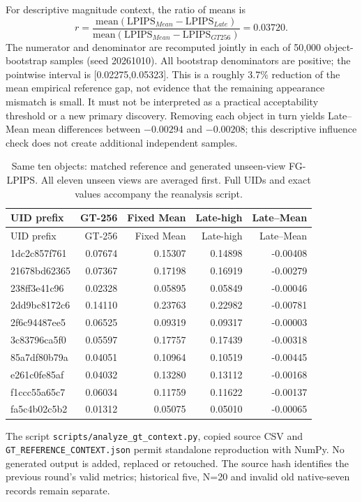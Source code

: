 \documentclass[11pt]{article}
\begin{document}
For descriptive magnitude context, the ratio of means is
\[
 r=\frac{\mathrm{mean}(\mathrm{LPIPS}_{Mean}-\mathrm{LPIPS}_{Late})}{\mathrm{mean}(\mathrm{LPIPS}_{Mean}-\mathrm{LPIPS}_{GT256})}=0.03720.
\]
The numerator and denominator are recomputed jointly in each of 50,000 object-bootstrap samples (seed 20261010). All bootstrap denominators are positive; the pointwise interval is [0.02275,0.05323]. This is a roughly 3.7\% reduction of the mean empirical reference gap, not evidence that the remaining appearance mismatch is small. It must not be interpreted as a practical acceptability threshold or a new primary discovery. Removing each object in turn yields Late--Mean mean differences between $-0.00294$ and $-0.00208$; this descriptive influence check does not create additional independent samples.

\begin{longtable}{lrrrr}
\caption{Same ten objects: matched reference and generated unseen-view FG-LPIPS. All eleven unseen views are averaged first. Full UIDs and exact values accompany the reanalysis script.}\\
\toprule UID prefix & GT-256 & Fixed Mean & Late-high & Late--Mean \\
\midrule\endfirsthead
\toprule UID prefix & GT-256 & Fixed Mean & Late-high & Late--Mean \\
\midrule\endhead
1dc2c857f761 & 0.07674 & 0.15307 & 0.14898 & -0.00408 \\
21678bd62365 & 0.07367 & 0.17198 & 0.16919 & -0.00279 \\
238ff3e41c96 & 0.02328 & 0.05895 & 0.05849 & -0.00046 \\
2dd9bc8172c6 & 0.14110 & 0.23763 & 0.22982 & -0.00781 \\
2f6c94487ee5 & 0.06525 & 0.09319 & 0.09317 & -0.00003 \\
3c83796ca5f0 & 0.05597 & 0.17757 & 0.17439 & -0.00318 \\
85a7df80b79a & 0.04051 & 0.10964 & 0.10519 & -0.00445 \\
e261c0fe85af & 0.04032 & 0.13280 & 0.13112 & -0.00168 \\
f1ccc55a65c7 & 0.06034 & 0.11759 & 0.11622 & -0.00137 \\
fa5c4b02c5b2 & 0.01312 & 0.05075 & 0.05010 & -0.00065 \\
\bottomrule\end{longtable}
The script \texttt{scripts/analyze\_gt\_context.py}, copied source CSV and \texttt{GT\_REFERENCE\_CONTEXT.json} permit standalone reproduction with NumPy. No generated output is added, replaced or retouched. The source hash identifies the previous round's valid metrics; historical five, N=20 and invalid old native-seven records remain separate.
\end{document}
